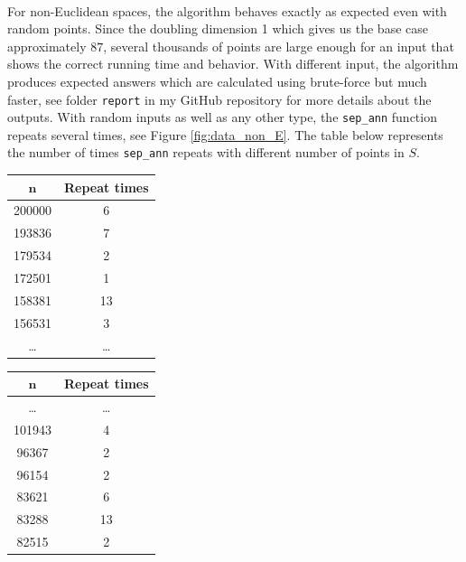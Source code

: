 \documentclass[12pt,english,]{article}
\newcommand{\code}[1]{\colorbox{light-gray}{\texttt{#1}}}
\let\origfigure\figure
\let\endorigfigure\endfigure
\renewenvironment{figure}[1][2] {
    \expandafter\origfigure\expandafter[H]
} {
    \endorigfigure
}
\begin{document}
~

For non-Euclidean spaces, the algorithm behaves exactly as expected even
with random points. Since the doubling dimension 1 which gives us the
base case approximately \(87\), several thousands of points are large
enough for an input that shows the correct running time and behavior.
With different input, the algorithm produces expected answers which are
calculated using brute-force but much faster, see folder \code{report}
in my GitHub repository for more details about the outputs. With random
inputs as well as any other type, the \code{sep\_ann} function repeats
several times, see Figure \ref{fig:data_non_E}. The table below
represents the number of times \code{sep\_ann} repeats with different
number of points in \(S\).

\begin{figure}
\begin{minipage}{0.48\textwidth}
  \centering
  \begin{tabular}{|c|c|}
  \hline
  $\boldsymbol n$   & \textbf{Repeat times} \\ \hline
   200000  & 6            \\ \hline
   193836  & 7            \\ \hline
   179534  & 2            \\ \hline
   172501  & 1            \\ \hline
   158381  & 13           \\ \hline
   156531  & 3            \\ \hline
  \ldots   & \ldots       \\ \hline
  \end{tabular}
\end{minipage}
\begin{minipage}{0.48\textwidth}
  \centering
  \begin{tabular}{|c|c|}
  \hline
  $\boldsymbol n$   & \textbf{Repeat times} \\ \hline
  \ldots   & \ldots       \\ \hline
  101943   & 4            \\ \hline
   96367   & 2            \\ \hline
   96154   & 2            \\ \hline
   83621   & 6            \\ \hline
   83288   & 13           \\ \hline
   82515   & 2            \\ \hline
  \end{tabular}
\end{minipage}
\caption[Caption]{Given an input of $200\,000$ points generated in a grid. This is a portion of the data about the number of times the algorithm \textsc{SepAnn$(S,n,d,\mu,c)$} repeats.}
\label{fig:data_non_E}
\end{figure}
\end{document}
